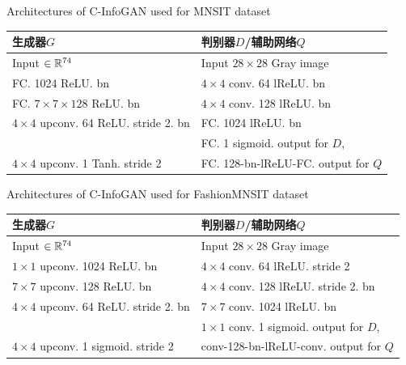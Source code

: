 \begin{table}[htbp]
  \renewcommand\arraystretch{0.7} %
  \centering
  {Architectures of C-InfoGAN used for MNSIT dataset}
  \begin{tabular}{l|l}
    \toprule
    \textbf{生成器$G$}                        & \textbf{判别器$D$/辅助网络$Q$} \\ \midrule
    Input $\in \mathbb{R}^{74}$                   & Input $28\times 28$ Gray image \\ \hline
    FC. 1024 ReLU. bn                         & $4\times 4$ conv. 64 lReLU. bn  \\ \hline
    FC. $7\times7\times128$ ReLU. bn          & $4\times 4$ conv. 128 lReLU. bn \\ \hline
    $4\times 4$ upconv. 64 ReLU. stride 2. bn & FC. 1024 lReLU. bn \\ \hline
    ~                                         & FC. 1 sigmoid. output for $D$, \\
    $4\times 4$ upconv. 1 Tanh. stride 2      & FC. 128-bn-lReLU-FC. output for $Q$ \\
    \bottomrule
  \end{tabular}
  \label{tab:m-cig-netarch}
\end{table}
\begin{table}[htbp]
  \renewcommand\arraystretch{0.7} %
  \centering
  {Architectures of C-InfoGAN used for FashionMNSIT dataset}
  \label{tab:fm-cig-netarch}
  \begin{tabular}{l|l}
    \toprule
    \textbf{生成器$G$}                        & \textbf{判别器$D$/辅助网络$Q$} \\ \midrule
    Input $\in \mathbb{R}^{74}$                   & Input $28\times 28$ Gray image \\ \hline
    $1\times 1$ upconv. 1024 ReLU. bn         & $4\times 4$ conv. 64 lReLU. stride 2  \\ \hline
    $7\times 7$ upconv. 128 ReLU. bn          & $4\times 4$ conv. 128 lReLU. stride 2. bn \\ \hline
    $4\times 4$ upconv. 64 ReLU. stride 2. bn & $7\times 7$ conv. 1024 lReLU. bn \\ \hline
    ~                                         & $1\times 1$ conv. 1 sigmoid. output for $D$, \\
    $4\times 4$ upconv. 1 sigmoid. stride 2   & conv-128-bn-lReLU-conv. output for $Q$ \\
    \bottomrule
  \end{tabular}
\end{table}

